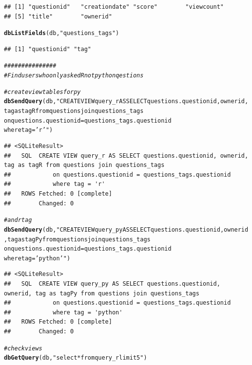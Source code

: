 \documentclass{article}\usepackage[]{graphicx}\usepackage[]{color}
\makeatletter
\newcommand{\hlstr}[1]{\textcolor[rgb]{0.192,0.494,0.8}{#1}}%
\newcommand{\hlcom}[1]{\textcolor[rgb]{0.678,0.584,0.686}{\textit{#1}}}%
\newcommand{\hlstd}[1]{\textcolor[rgb]{0.345,0.345,0.345}{#1}}%
\newcommand{\hlkwd}[1]{\textcolor[rgb]{0.737,0.353,0.396}{\textbf{#1}}}%
\newenvironment{kframe}{%
 \def\at@end@of@kframe{}%
 \ifinner\ifhmode%
  \def\at@end@of@kframe{\end{minipage}}%
  \begin{minipage}{\columnwidth}%
 \fi\fi%
 \def\FrameCommand##1{\hskip\@totalleftmargin \hskip-\fboxsep
 \colorbox{shadecolor}{##1}\hskip-\fboxsep
     \hskip-\linewidth \hskip-\@totalleftmargin \hskip\columnwidth}%
 \MakeFramed {\advance\hsize-\width
   \@totalleftmargin\z@ \linewidth\hsize
   \@setminipage}}%
 {\par\unskip\endMakeFramed%
 \at@end@of@kframe}
\newenvironment{knitrout}{}{} %
\makeatother
\begin{document}
\begin{knitrout}
\begin{kframe}
{\ttfamily\noindent\color{warningcolor}{\#\# Warning: Closing open result set, pending rows}}\begin{verbatim}
## [1] "questionid"   "creationdate" "score"        "viewcount"   
## [5] "title"        "ownerid"
\end{verbatim}
\begin{alltt}
\hlkwd{dbListFields}\hlstd{(db,} \hlstr{"questions_tags"}\hlstd{)}
\end{alltt}
\begin{verbatim}
## [1] "questionid" "tag"
\end{verbatim}
\begin{alltt}
\hlcom{###############}
\hlcom{# Find users who only asked R not python qestions}

\hlcom{#create view tables for py }
\hlkwd{dbSendQuery}\hlstd{(db,} \hlstr{"CREATE VIEW query_r AS SELECT questions.questionid, ownerid, tag as tagR from questions join questions_tags 
           on questions.questionid = questions_tags.questionid 
           where tag = 'r'"}\hlstd{)}
\end{alltt}
\begin{verbatim}
## <SQLiteResult>
##   SQL  CREATE VIEW query_r AS SELECT questions.questionid, ownerid, tag as tagR from questions join questions_tags 
##            on questions.questionid = questions_tags.questionid 
##            where tag = 'r'
##   ROWS Fetched: 0 [complete]
##        Changed: 0
\end{verbatim}
\begin{alltt}
\hlcom{# and r tag }
\hlkwd{dbSendQuery}\hlstd{(db,} \hlstr{"CREATE VIEW query_py AS SELECT questions.questionid, ownerid, tag as tagPy from questions join questions_tags 
           on questions.questionid = questions_tags.questionid 
           where tag = 'python'"}\hlstd{)}
\end{alltt}


{\ttfamily\noindent\color{warningcolor}{\#\# Warning: Closing open result set, pending rows}}\begin{verbatim}
## <SQLiteResult>
##   SQL  CREATE VIEW query_py AS SELECT questions.questionid, ownerid, tag as tagPy from questions join questions_tags 
##            on questions.questionid = questions_tags.questionid 
##            where tag = 'python'
##   ROWS Fetched: 0 [complete]
##        Changed: 0
\end{verbatim}
\begin{alltt}
\hlcom{#check views}
\hlkwd{dbGetQuery}\hlstd{(db,} \hlstr{"select * from query_r limit 5"}\hlstd{)}
\end{alltt}



\end{kframe}
\end{knitrout}
\end{document}
